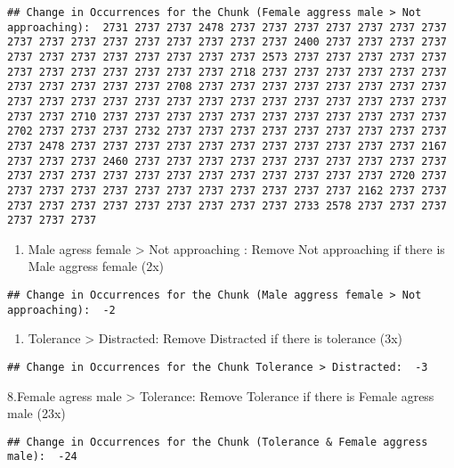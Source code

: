 \documentclass[
]{article}
\providecommand{\tightlist}{%
  \setlength{\itemsep}{0pt}\setlength{\parskip}{0pt}}
\begin{document}
\begin{verbatim}
## Change in Occurrences for the Chunk (Female aggress male > Not approaching):  2731 2737 2737 2478 2737 2737 2737 2737 2737 2737 2737 2737 2737 2737 2737 2737 2737 2737 2737 2737 2400 2737 2737 2737 2737 2737 2737 2737 2737 2737 2737 2737 2737 2573 2737 2737 2737 2737 2737 2737 2737 2737 2737 2737 2737 2737 2718 2737 2737 2737 2737 2737 2737 2737 2737 2737 2737 2737 2708 2737 2737 2737 2737 2737 2737 2737 2737 2737 2737 2737 2737 2737 2737 2737 2737 2737 2737 2737 2737 2737 2737 2737 2737 2710 2737 2737 2737 2737 2737 2737 2737 2737 2737 2737 2737 2702 2737 2737 2737 2732 2737 2737 2737 2737 2737 2737 2737 2737 2737 2737 2478 2737 2737 2737 2737 2737 2737 2737 2737 2737 2737 2737 2167 2737 2737 2737 2460 2737 2737 2737 2737 2737 2737 2737 2737 2737 2737 2737 2737 2737 2737 2737 2737 2737 2737 2737 2737 2737 2737 2720 2737 2737 2737 2737 2737 2737 2737 2737 2737 2737 2737 2737 2162 2737 2737 2737 2737 2737 2737 2737 2737 2737 2737 2737 2733 2578 2737 2737 2737 2737 2737 2737
\end{verbatim}

\begin{enumerate}
\def\labelenumi{\arabic{enumi}.}
\setcounter{enumi}{5}
\tightlist
\item
  Male agress female \textgreater{} Not approaching : Remove Not
  approaching if there is Male aggress female (2x)
\end{enumerate}

\begin{verbatim}
## Change in Occurrences for the Chunk (Male aggress female > Not approaching):  -2
\end{verbatim}

\begin{enumerate}
\def\labelenumi{\arabic{enumi}.}
\setcounter{enumi}{6}
\tightlist
\item
  Tolerance \textgreater{} Distracted: Remove Distracted if there is
  tolerance (3x)
\end{enumerate}

\begin{verbatim}
## Change in Occurrences for the Chunk Tolerance > Distracted:  -3
\end{verbatim}

8.Female agress male \textgreater{} Tolerance: Remove Tolerance if there
is Female agress male (23x)

\begin{verbatim}
## Change in Occurrences for the Chunk (Tolerance & Female aggress male):  -24
\end{verbatim}
\end{document}
